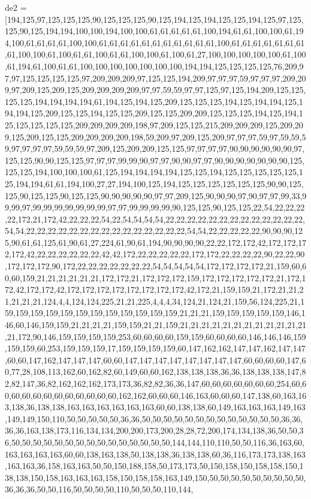 de2 = [194,125,97,125,125,125,90,125,125,125,90,125,194,125,194,125,125,194,125,97,125,125,90,125,194,194,100,100,194,100,100,61,61,61,61,61,100,194,61,61,100,100,61,194,100,61,61,61,61,100,100,61,61,61,61,61,61,61,61,61,61,61,100,61,61,61,61,61,61,61,61,100,100,61,100,61,61,100,61,61,100,100,61,100,61,27,100,100,100,100,100,61,100,61,194,61,100,61,61,100,100,100,100,100,100,100,194,194,125,125,125,125,76,209,97,97,125,125,125,125,97,209,209,209,97,125,125,194,209,97,97,97,59,97,97,97,209,209,97,209,125,209,125,209,209,209,209,97,97,59,59,97,97,125,97,125,194,209,125,125,125,125,194,194,194,194,61,194,125,194,125,209,125,125,125,194,125,194,194,125,194,194,125,209,125,125,194,125,125,209,125,125,209,209,125,125,125,194,125,194,125,125,125,125,125,209,209,209,209,198,97,209,125,125,215,209,209,209,125,209,209,125,209,125,125,209,209,209,209,198,59,209,97,209,125,209,97,97,97,59,97,59,59,59,97,97,97,97,59,59,59,97,209,125,209,209,125,125,97,97,97,97,90,90,90,90,90,90,97,125,125,90,90,125,125,97,97,97,99,99,90,97,97,90,90,97,97,90,90,90,90,90,90,90,125,125,125,194,100,100,100,61,125,194,194,194,194,125,125,194,125,125,125,125,125,125,194,194,61,61,194,100,27,27,194,100,125,194,125,125,125,125,125,125,90,90,125,125,90,125,125,90,125,125,90,90,90,90,90,97,97,209,125,90,90,90,97,90,97,97,99,33,99,99,97,99,99,99,99,99,99,99,97,97,99,99,99,99,90,125,125,90,125,125,22,54,22,22,22,22,172,21,172,42,22,22,22,54,22,54,54,54,54,22,22,22,22,22,22,22,22,22,22,22,22,22,54,54,22,22,22,22,22,22,22,22,22,22,22,22,22,22,22,54,54,22,22,22,22,22,90,90,90,125,90,61,61,125,61,90,61,27,224,61,90,61,194,90,90,90,90,22,22,172,172,42,172,172,172,172,42,22,22,22,22,22,22,42,42,172,22,22,22,22,22,172,172,22,22,22,22,90,22,22,90,172,172,172,90,172,22,22,22,22,22,22,22,54,54,54,54,54,172,172,172,172,21,159,60,60,60,159,21,21,21,21,21,21,172,172,21,172,172,172,159,172,172,172,172,172,21,172,172,42,172,172,42,172,172,172,172,172,172,172,172,42,172,21,159,159,21,172,21,21,21,21,21,21,124,4,4,124,124,225,21,21,225,4,4,4,34,124,21,124,21,159,56,124,225,21,159,159,159,159,159,159,159,159,159,159,159,159,21,21,21,159,159,159,159,159,146,146,60,146,159,159,21,21,21,21,159,159,21,21,159,21,21,21,21,21,21,21,21,21,21,21,21,21,172,90,146,159,159,159,159,253,60,60,60,60,159,159,60,60,60,60,146,146,146,159,159,159,60,253,159,159,159,17,159,159,159,159,60,147,162,162,147,147,162,147,147,60,60,147,162,147,147,147,60,60,147,147,147,147,147,147,147,147,60,60,60,60,147,60,77,28,108,113,162,60,162,82,60,149,60,60,162,138,138,138,36,36,138,138,138,147,82,82,147,36,82,162,162,162,173,173,36,82,82,36,36,147,60,60,60,60,60,60,60,254,60,60,60,60,60,60,60,60,60,60,60,60,162,162,60,60,60,146,163,60,60,60,147,138,60,163,163,138,36,138,138,163,163,163,163,163,163,60,60,138,138,60,149,163,163,163,149,163,149,149,150,110,50,50,50,50,50,36,36,50,50,50,50,50,50,50,50,50,50,50,50,50,36,36,36,36,163,138,173,116,134,134,200,200,173,200,28,28,72,200,174,134,138,36,50,50,36,50,50,50,50,50,50,50,50,50,50,50,50,50,50,50,144,144,110,110,50,50,116,36,163,60,163,163,163,163,60,60,138,163,138,50,138,138,36,138,138,60,36,116,173,173,138,163,163,163,36,158,163,163,50,50,150,188,158,50,173,173,50,150,158,150,158,158,150,138,138,150,158,163,163,163,158,150,158,158,163,149,150,50,50,50,50,50,50,50,50,50,36,36,36,50,50,116,50,50,50,50,110,50,50,50,110,144,